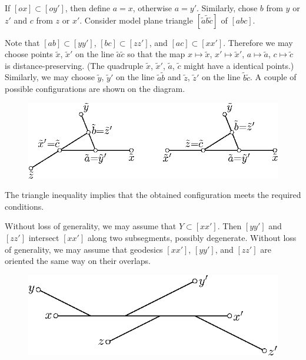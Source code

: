 \documentclass{article}
\begin{document}
If $[ox]\subset [oy']$, then define $a=x$, otherwise $a=y'$.
Similarly, chose  $b$ from $y$ or $z'$ and $c$ from $z$ or $x'$.
Consider model plane triangle $[\tilde a\tilde b\tilde c]$ of $[abc]$.

Note that $[ab]\subset [yy']$, $[bc]\subset [zz']$, and $[ac]\subset [xx']$.
Therefore we may choose points $\tilde x$, $\tilde x'$ on the line $\tilde a\tilde c$ so that the map $x\mapsto \tilde x$, $x'\mapsto \tilde x'$, $a\mapsto \tilde a$, $c\mapsto \tilde c$ is distance-preserving.
(The quadruple $\tilde x$, $\tilde x'$, $\tilde a$, $\tilde c$ might have a identical points.)
Similarly, we may choose $\tilde y$, $\tilde y'$ on the line $\tilde a\tilde b$ and $\tilde z$, $\tilde z'$ on the line $\tilde b\tilde c$.
A couple of possible configurations are shown on the diagram.

\begin{figure}[ht!]
\centering
\includegraphics{mppics/pic-50}
\end{figure}

The triangle inequality implies that the obtained configuration meets the required conditions.

Without loss of generality, we may assume that $Y\subset [xx']$.
Then $[yy']$ and $[zz']$ intersect $[xx']$ along two subsegments, possibly degenerate.
Without loss of generality, we may assume that geodesics $[xx']$, $[yy']$, and $[zz']$ are oriented the same way on their overlaps.

\begin{figure}[ht!]
\centering
\includegraphics{mppics/pic-60}
\end{figure}
\end{document}
